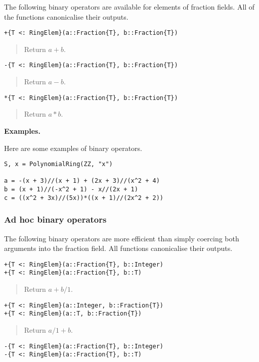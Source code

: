 \documentclass[a4paper,10pt]{article}
\newcommand{\desc}[1]{\vspace{-3mm}\begin{quote}#1\end{quote}}
\begin{document}
The following binary operators are available for elements of fraction fields.
All of the functions canonicalise their outputs.

\begin{lstlisting}
+{T <: RingElem}(a::Fraction{T}, b::Fraction{T})
\end{lstlisting}

\desc{Return $a + b$.}

\begin{lstlisting}
-{T <: RingElem}(a::Fraction{T}, b::Fraction{T})
\end{lstlisting}

\desc{Return $a - b$.}

\begin{lstlisting}
*{T <: RingElem}(a::Fraction{T}, b::Fraction{T})
\end{lstlisting}

\desc{Return $a*b$.}

\textbf{Examples.}

Here are some examples of binary operators.

\begin{lstlisting}
S, x = PolynomialRing(ZZ, "x")

a = -(x + 3)//(x + 1) + (2x + 3)//(x^2 + 4)
b = (x + 1)//(-x^2 + 1) - x//(2x + 1)
c = ((x^2 + 3x)//(5x))*((x + 1)//(2x^2 + 2))
\end{lstlisting}

\subsubsection{Ad hoc binary operators}

The following binary operators are more efficient than simply coercing both
arguments into the fraction field. All functions canonicalise their outputs.

\begin{lstlisting}
+{T <: RingElem}(a::Fraction{T}, b::Integer)
+{T <: RingElem}(a::Fraction{T}, b::T)
\end{lstlisting}

\desc{Return $a + b/1$.}

\begin{lstlisting}
+{T <: RingElem}(a::Integer, b::Fraction{T})
+{T <: RingElem}(a::T, b::Fraction{T})
\end{lstlisting}

\desc{Return $a/1 + b$.}

\begin{lstlisting}
-{T <: RingElem}(a::Fraction{T}, b::Integer)
-{T <: RingElem}(a::Fraction{T}, b::T)
\end{lstlisting}
\end{document}
